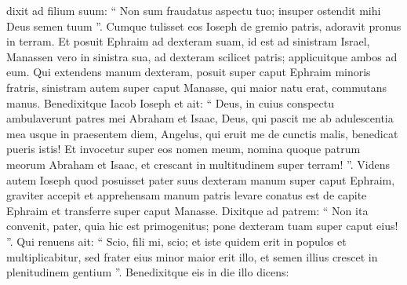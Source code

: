 \begin{biblechapter}
\begin{biblechapter}
\begin{biblechapter}
\begin{biblechapter}
\begin{biblechapter}
\begin{biblechapter}
\begin{biblechapter}
\begin{biblechapter}
\begin{biblechapter}
\begin{biblechapter}
\begin{biblechapter}
\begin{biblechapter}
\begin{biblechapter}
\begin{biblechapter}
\begin{biblechapter}
\begin{biblechapter}
\begin{biblechapter}
\begin{biblechapter}
\begin{biblechapter}
\begin{biblechapter}
\begin{biblechapter}
\begin{biblechapter}
\begin{biblechapter}
\begin{biblechapter}
\begin{biblechapter}
\begin{biblechapter}
\begin{biblechapter}
\begin{biblechapter}
\begin{biblechapter}
\begin{biblechapter}
\begin{biblechapter}
\begin{biblechapter}
\begin{biblechapter}
\begin{biblechapter}
\begin{biblechapter}
\begin{biblechapter}
\begin{biblechapter}
\begin{biblechapter}
\begin{biblechapter}
\begin{biblechapter}
\begin{biblechapter}
\begin{biblechapter}
\begin{biblechapter}
\begin{biblechapter}
\begin{biblechapter}
\begin{biblechapter}
\begin{biblechapter}
\begin{biblechapter}
\verse dixit ad filium suum: “ Non sum fraudatus aspectu tuo; insuper ostendit mihi Deus semen tuum ”. 
\verse Cumque tulisset eos Ioseph de gremio patris, adoravit pronus in terram. 
\verse Et posuit Ephraim ad dexteram suam, id est ad sinistram Israel, Manassen vero in sinistra sua, ad dexteram scilicet patris; applicuitque ambos ad eum. 
\verse Qui extendens manum dexteram, posuit super caput Ephraim minoris fratris, sinistram autem super caput Manasse, qui maior natu erat, commutans manus. 
\verse Benedixitque Iacob Ioseph et ait:
 “ Deus, in cuius conspectu ambulaverunt
 patres mei Abraham et Isaac,
 Deus, qui pascit me ab adulescentia mea
 usque in praesentem diem,
 \verse Angelus, qui eruit me de cunctis malis,
 benedicat pueris istis!
 Et invocetur super eos nomen meum,
 nomina quoque patrum meorum Abraham et Isaac,
 et crescant in multitudinem
 super terram! ”.
 \verse Videns autem Ioseph quod posuisset pater suus dexteram manum super caput Ephraim, graviter accepit et apprehensam manum patris levare conatus est de capite Ephraim et transferre super caput Manasse. 
\verse Dixitque ad patrem: “ Non ita convenit, pater, quia hic est primogenitus; pone dexteram tuam super caput eius! ”. 
\verse Qui renuens ait: “ Scio, fili mi, scio; et iste quidem erit in populos et multiplicabitur, sed frater eius minor maior erit illo, et semen illius crescet in plenitudinem gentium ”. 
\verse Benedixitque eis in die illo dicens:

\end{biblechapter}
\end{biblechapter}
\end{biblechapter}
\end{biblechapter}
\end{biblechapter}
\end{biblechapter}
\end{biblechapter}
\end{biblechapter}
\end{biblechapter}
\end{biblechapter}
\end{biblechapter}
\end{biblechapter}
\end{biblechapter}
\end{biblechapter}
\end{biblechapter}
\end{biblechapter}
\end{biblechapter}
\end{biblechapter}
\end{biblechapter}
\end{biblechapter}
\end{biblechapter}
\end{biblechapter}
\end{biblechapter}
\end{biblechapter}
\end{biblechapter}
\end{biblechapter}
\end{biblechapter}
\end{biblechapter}
\end{biblechapter}
\end{biblechapter}
\end{biblechapter}
\end{biblechapter}
\end{biblechapter}
\end{biblechapter}
\end{biblechapter}
\end{biblechapter}
\end{biblechapter}
\end{biblechapter}
\end{biblechapter}
\end{biblechapter}
\end{biblechapter}
\end{biblechapter}
\end{biblechapter}
\end{biblechapter}
\end{biblechapter}
\end{biblechapter}
\end{biblechapter}
\end{biblechapter}
